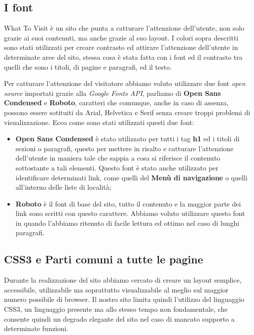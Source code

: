 \subsection{I font}\label{sec:Pres-Font}
What To Visit è un sito che punta a catturare l'attenzione dell'utente, non
solo grazie ai suoi contenuti, ma anche grazie al suo layout.
I colori sopra descritti sono stati utilizzati per creare contrasto ed
attirare l'attenzione dell'utente in determinate aree del sito, stessa cosa è
stata fatta con i font ed il contrasto tra quelli che sono i titoli, di pagine
e paragrafi, ed il testo.

Per catturare l'attenzione del visitatore abbiamo voluto utilizzare due font
\textit{open source} importati grazie alla \textit{Google Fonts API}, parliamo
di \textbf{Open Sans Condensed} e \textbf{Roboto}, caratteri che comunque,
anche in caso di assenza, possono essere sotituiti da Arial, Helvetica e Serif
senza creare troppi problemi di visualizzazione. Ecco come sono stati
utilizzati questi due font:
\begin{itemize}
\item \textbf{Open Sans Condensed} è stato utilizzato per tutti i tag
\textbf{h1} ed i titoli di sezioni o paragrafi, questo per mettere in risalto
e catturare l'attenzione dell'utente in maniera tale che sappia a cosa si
riferisce il contenuto sottostante a tali elementi. Questo font è stato anche
utilizzato per identificare determinati link, come quelli del \textbf{Menù di
navigazione} o quelli all'interno delle liste di località;
\item \textbf{Roboto} è il font di base del sito, tutto il contenuto e la
maggior parte dei link sono scritti con questo carattere. Abbiamo voluto
utilizzare questo font in quando l'abbiamo ritenuto di facile lettura ed
ottimo nel caso di lunghi paragrafi.
\end{itemize}

\subsection{CSS3 e Parti comuni a tutte le pagine}
Durante la realizzazione del sito abbiamo cercato di creare un layout
semplice, accessibile, utilizzabile ma soprattutto visualizzabile al meglio sul
maggior numero possibile di browser. Il nostro sito limita quindi l'utilizzo
del linguaggio CSS3, un linguaggio presente ma allo stesso tempo non
fondamentale, che consente quindi un degrado elegante del sito nel caso di
mancato supporto a determinate funzioni.

